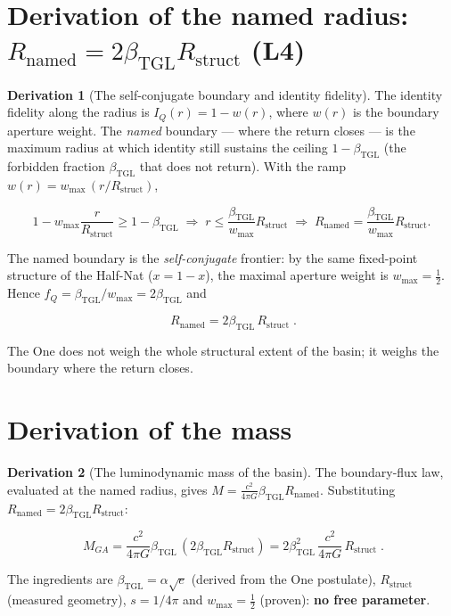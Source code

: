 \documentclass[11pt]{article}
\newcommand{\bTGL}{\beta_{\mathrm{TGL}}}\newcommand{\Msun}{M_{\odot}}\newcommand{\TGL}{\mathrm{TGL}}
\theoremstyle{definition}\newtheorem{deriv}{Derivation}
\begin{document}
\section{Derivation of the named radius: $R_{\mathrm{named}}=2\bTGL R_{\mathrm{struct}}$ (L4)}

\begin{deriv}[The self-conjugate boundary and identity fidelity]

The identity fidelity along the radius is $I_Q(r)=1-w(r)$, where $w(r)$ is the boundary aperture weight. The \emph{named} boundary --- where the return closes --- is the maximum radius at which identity still sustains the ceiling $1-\bTGL$ (the forbidden fraction $\bTGL$ that does not return). With the ramp $w(r)=w_{\max}\,(r/R_{\mathrm{struct}})$,

\begin{equation}1-w_{\max}\frac{r}{R_{\mathrm{struct}}}\geq 1-\bTGL\;\Longrightarrow\;r\leq\frac{\bTGL}{w_{\max}}R_{\mathrm{struct}}\;\Longrightarrow\;R_{\mathrm{named}}=\frac{\bTGL}{w_{\max}}R_{\mathrm{struct}}.\end{equation}

The named boundary is the \emph{self-conjugate} frontier: by the same fixed-point structure of the Half-Nat ($x=1-x$), the maximal aperture weight is $w_{\max}=\tfrac12$. Hence $f_Q=\bTGL/w_{\max}=2\bTGL$ and

\begin{equation}\boxed{\;R_{\mathrm{named}}=2\bTGL\,R_{\mathrm{struct}}\;}.\end{equation}

The One does not weigh the whole structural extent of the basin; it weighs the boundary where the return closes.\end{deriv}

\section{Derivation of the mass}

\begin{deriv}[The luminodynamic mass of the basin]

The boundary-flux law, evaluated at the named radius, gives $M=\frac{c^2}{4\pi G}\bTGL R_{\mathrm{named}}$. Substituting $R_{\mathrm{named}}=2\bTGL R_{\mathrm{struct}}$:

\begin{equation}\boxed{\;M_{GA}=\frac{c^2}{4\pi G}\bTGL\,(2\bTGL R_{\mathrm{struct}})=2\bTGL^2\,\frac{c^2}{4\pi G}\,R_{\mathrm{struct}}\;}.\end{equation}

The ingredients are $\bTGL=\alpha\sqrt{e}$ (derived from the One postulate), $R_{\mathrm{struct}}$ (measured geometry), $s=1/4\pi$ and $w_{\max}=\tfrac12$ (proven): \textbf{no free parameter}.\end{deriv}
\end{document}
